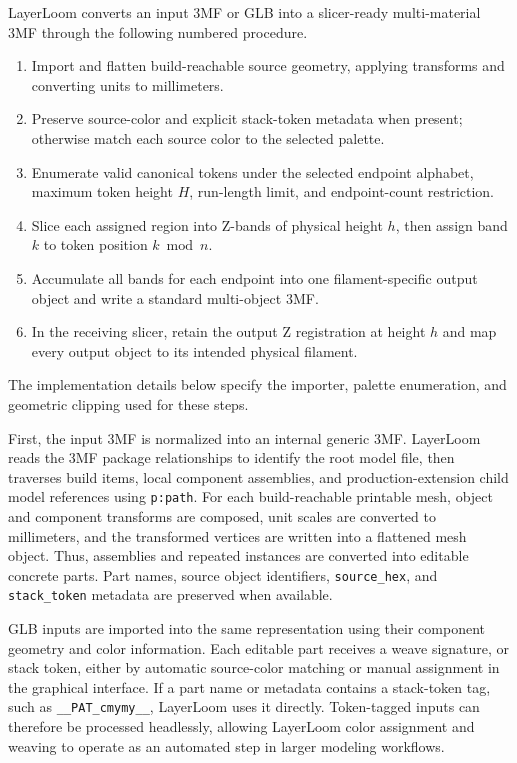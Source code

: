 \documentclass[5p,times,numbers]{elsarticle}
\begin{document}
LayerLoom converts an input 3MF or GLB into a slicer-ready multi-material 3MF through the following numbered procedure.
\begin{enumerate}
    \item Import and flatten build-reachable source geometry, applying transforms and converting units to millimeters.
    \item Preserve source-color and explicit stack-token metadata when present; otherwise match each source color to the selected palette.
    \item Enumerate valid canonical tokens under the selected endpoint alphabet, maximum token height \(H\), run-length limit, and endpoint-count restriction.
    \item Slice each assigned region into Z-bands of physical height \(h\), then assign band \(k\) to token position \(k \bmod n\).
    \item Accumulate all bands for each endpoint into one filament-specific output object and write a standard multi-object 3MF.
    \item In the receiving slicer, retain the output Z registration at height \(h\) and map every output object to its intended physical filament.
\end{enumerate}

The implementation details below specify the importer, palette enumeration, and geometric clipping used for these steps.

First, the input 3MF is normalized into an internal generic 3MF. LayerLoom reads the 3MF package relationships to identify the root model file, then traverses build items, local component assemblies, and production-extension child model references using \texttt{p:path}. For each build-reachable printable mesh, object and component transforms are composed, unit scales are converted to millimeters, and the transformed vertices are written into a flattened mesh object. Thus, assemblies and repeated instances are converted into editable concrete parts. Part names, source object identifiers, \texttt{source\_hex}, and \texttt{stack\_token} metadata are preserved when available.

GLB inputs are imported into the same representation using their component geometry and color information. Each editable part receives a weave signature, or stack token, either by automatic source-color matching or manual assignment in the graphical interface. If a part name or metadata contains a stack-token tag, such as \texttt{\_\_PAT\_cmymy\_\_}, LayerLoom uses it directly. Token-tagged inputs can therefore be processed headlessly, allowing LayerLoom color assignment and weaving to operate as an automated step in larger modeling workflows.
\end{document}
